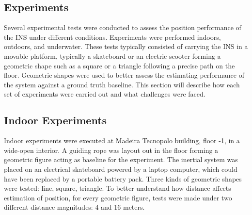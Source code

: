 \newpage




\subsection{Experiments}
\label{sub:experiments}

Several experimental tests were conducted to assess the position performance of the INS under different conditions. Experiments were performed indoors, outdoors, and underwater. These tests typically consisted of carrying the INS in a movable platform, typically a skateboard or an electric scooter forming a geometric shape such as a square or a triangle following a precise path on the floor. Geometric shapes were used to better assess the estimating performance of the system against a ground truth baseline. This section will describe how each set of experiments were carried out and what challenges were faced.

\subsection{Indoor Experiments}

Indoor experiments were executed at Madeira Tecnopolo building, floor -1, in a wide-open interior. A guiding rope was layout out in the floor forming a geometric figure acting as baseline for the experiment. The inertial system was placed on an electrical skateboard powered by a laptop computer, which could have been replaced by a portable battery pack. Three kinds of geometric shapes were tested: line, square, triangle. To better understand how distance affects estimation of position, for every geometric figure, tests were made under two different distance magnitudes: 4 and 16 meters.

